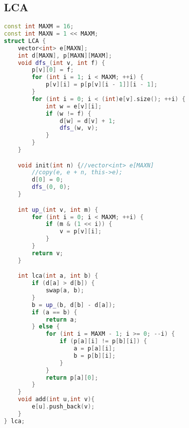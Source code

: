 \subsection{LCA}
		\begin{lstlisting}[language=c++]
const int MAXM = 16;
const int MAXN = 1 << MAXM;
struct LCA {
	vector<int> e[MAXN];
	int d[MAXN], p[MAXN][MAXM];
	void dfs_(int v, int f) {
		p[v][0] = f;
		for (int i = 1; i < MAXM; ++i) {
			p[v][i] = p[p[v][i - 1]][i - 1];
		}
		for (int i = 0; i < (int)e[v].size(); ++i) {
			int w = e[v][i];
			if (w != f) {
				d[w] = d[v] + 1;
				dfs_(w, v);
			}
		}
	}

	void init(int n) {//vector<int> e[MAXN]
		//copy(e, e + n, this->e);
		d[0] = 0;
		dfs_(0, 0);
	}

	int up_(int v, int m) {
		for (int i = 0; i < MAXM; ++i) {
			if (m & (1 << i)) {
				v = p[v][i];
			}
		}
		return v;
	}

	int lca(int a, int b) {
		if (d[a] > d[b]) {
			swap(a, b);
		}
		b = up_(b, d[b] - d[a]);
		if (a == b) {
			return a;
		} else {
			for (int i = MAXM - 1; i >= 0; --i) {
				if (p[a][i] != p[b][i]) {
					a = p[a][i];
					b = p[b][i];
				}
			}
			return p[a][0];
		}
	}
	void add(int u,int v){
		e[u].push_back(v);
	}
} lca;
	\end{lstlisting}